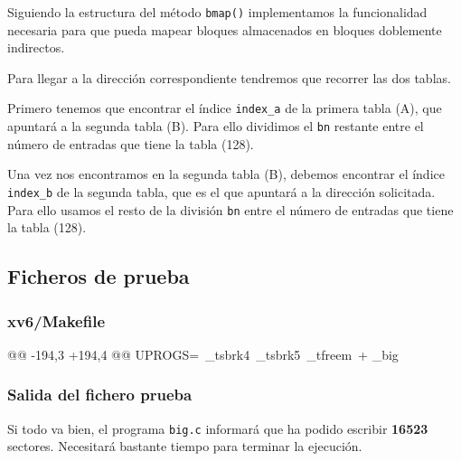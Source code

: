 \par Siguiendo la estructura del método \texttt{bmap()} implementamos la
funcionalidad necesaria para que pueda mapear bloques almacenados
en bloques doblemente indirectos. 

\par Para llegar a la dirección correspondiente tendremos que recorrer las 
dos tablas.

\par Primero tenemos que encontrar el índice \texttt{index\_a} de la primera tabla (A), que
apuntará a la segunda tabla (B). Para ello dividimos el \texttt{bn}
restante entre el número de entradas que tiene la tabla (128).

\par Una vez nos encontramos en la segunda tabla (B), debemos encontrar el índice \texttt{index\_b}
de la segunda tabla, que es el que apuntará a la dirección solicitada.
Para ello usamos el resto de la división \texttt{bn} entre el número de entradas
que tiene la tabla (128). 


\subsection{Ficheros de prueba}

\subsubsection{xv6/Makefile}
\begin{listing}
@@ -194,3 +194,4 @@ UPROGS=\
    _tsbrk4\
    _tsbrk5\
    _tfreem\
+   _big\
\end{listing}

\subsubsection{Salida del fichero prueba}

\par Si todo va bien, el programa \texttt{big.c} informará que ha podido escribir 
\textbf{16523} sectores. Necesitará bastante tiempo para terminar la ejecución.

